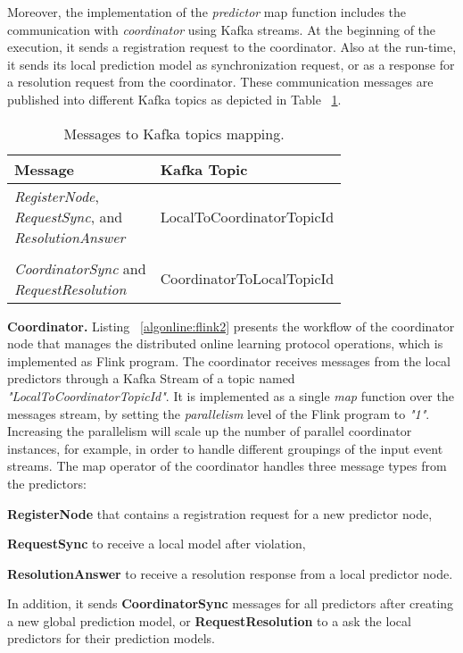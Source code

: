 \par Moreover, the implementation of  the \textit{predictor} map function includes the communication  with \textit{coordinator} using Kafka streams. At the beginning of the execution, it sends a registration request to the coordinator. Also at the run-time,  it sends  its local prediction model as synchronization request,  or as a response for a resolution request from the coordinator. These communication messages are published into different Kafka topics as depicted in Table ~\ref{tab:messagesToTopics}. 

\begin{table}[h]
	\caption{Messages to Kafka topics mapping.}
	\label{tab:messagesToTopics}
	\begin{tabular}{p{3cm}l}
		\toprule
		Message &Kafka Topic\\
		\midrule
		\parbox[t]{4cm}{\textit{RegisterNode}, \\ \textit{RequestSync}, and \\\textit{ResolutionAnswer} } &LocalToCoordinatorTopicId\\ \\
		
			  \parbox[t]{4cm}{\textit{CoordinatorSync} and \\ \textit{RequestResolution}} &CoordinatorToLocalTopicId\\
		\bottomrule
	\end{tabular}
\end{table}


\textbf{Coordinator.} Listing ~\ref{algonline:flink2} presents the workflow of the coordinator node that manages the distributed online learning protocol operations, which is implemented as Flink program. The coordinator receives messages from the local predictors through a Kafka Stream of a topic named \textit{"LocalToCoordinatorTopicId"}. It is implemented as a single \textit{map} function over the messages stream, by setting the \textit{parallelism} level of the Flink program to \textit{"1"}. Increasing the parallelism will scale up the number of parallel coordinator instances, for example, in order to handle different groupings of the input event streams. The map operator of the coordinator  handles three message types from the predictors: \begin{enumerate*}[(i)]
	\item \textbf{RegisterNode} that contains  a registration request for a new predictor node,
	\item \textbf{RequestSync} to receive a local model after violation,
	\item \textbf{ResolutionAnswer} to receive a resolution response from a local predictor node.  
\end{enumerate*}  
 In addition, it sends \textbf{CoordinatorSync} messages for all predictors after creating a new global prediction model, or \textbf{RequestResolution} to a ask the local predictors for their prediction models.
 

